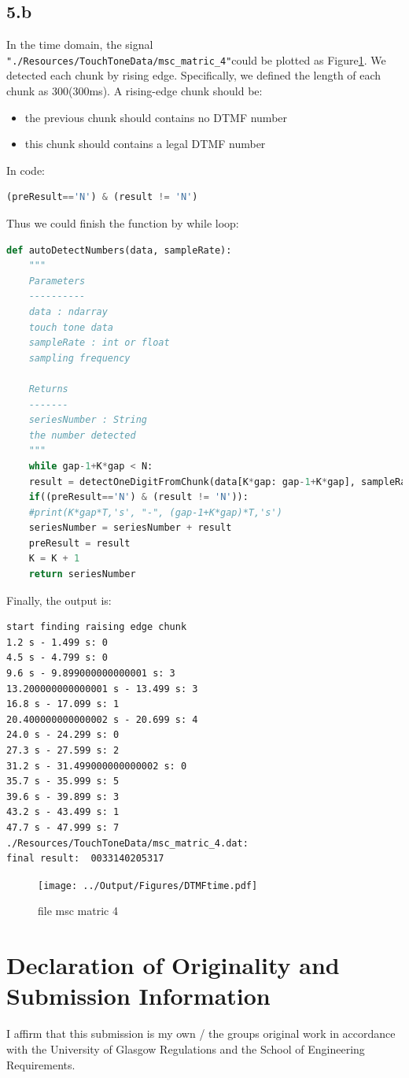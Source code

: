 \documentclass[a4paper,12pt]{article}
\begin{document}
\subsection{5.b}
In the time domain, the signal \lstinline{"./Resources/TouchToneData/msc_matric_4"}could be plotted as Figure\ref{fig_DTMFtime}. We detected each chunk by rising edge. Specifically, we defined the length of each chunk as 300(300ms). A rising-edge chunk should be:
\begin{itemize}
\item the previous chunk should contains no DTMF number
\item this chunk should contains a legal DTMF number
\end{itemize}
In code:
\begin{lstlisting}[language=Python]
(preResult=='N') & (result != 'N')
\end{lstlisting}
Thus we could finish the function by while loop:
\begin{lstlisting}[language=Python]
def autoDetectNumbers(data, sampleRate):
	"""
	Parameters
	----------
	data : ndarray
	touch tone data
	sampleRate : int or float
	sampling frequency
	
	Returns
	-------
	seriesNumber : String
	the number detected
	"""
	while gap-1+K*gap < N:
	result = detectOneDigitFromChunk(data[K*gap: gap-1+K*gap], sampleRate)
	if((preResult=='N') & (result != 'N')):
	#print(K*gap*T,'s', "-", (gap-1+K*gap)*T,'s')
	seriesNumber = seriesNumber + result
	preResult = result
	K = K + 1
	return seriesNumber
\end{lstlisting}
Finally, the output is:
\begin{lstlisting}
start finding raising edge chunk
1.2 s - 1.499 s: 0
4.5 s - 4.799 s: 0
9.6 s - 9.899000000000001 s: 3
13.200000000000001 s - 13.499 s: 3
16.8 s - 17.099 s: 1
20.400000000000002 s - 20.699 s: 4
24.0 s - 24.299 s: 0
27.3 s - 27.599 s: 2
31.2 s - 31.499000000000002 s: 0
35.7 s - 35.999 s: 5
39.6 s - 39.899 s: 3
43.2 s - 43.499 s: 1
47.7 s - 47.999 s: 7
./Resources/TouchToneData/msc_matric_4.dat:
final result:  0033140205317
\end{lstlisting}

\begin{figure}[h]   
	\centering 
	\texttt{[image: ../Output/Figures/DTMFtime.pdf]} 
	\caption{file msc matric 4}   
	\label{fig_DTMFtime}
\end{figure}

\clearpage
\section{Declaration of Originality and Submission Information}
I affirm that this submission is my own / the groups original work in accordance with the University of Glasgow Regulations and the School of Engineering Requirements.
\end{document}
